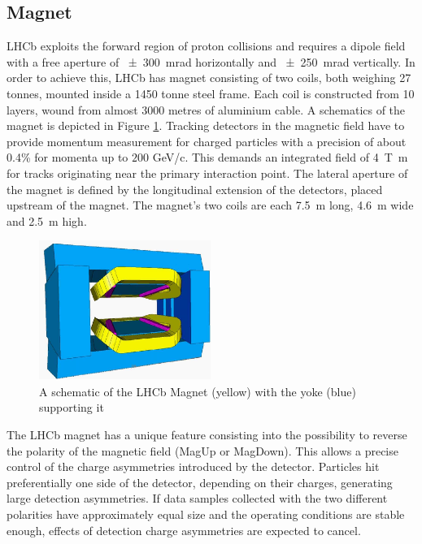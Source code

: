 \subsection{Magnet}
LHCb exploits the forward region of proton collisions and requires a dipole field with a free aperture of \SI{\pm300}{\milli\radian} horizontally and \SI{\pm250}{\milli\radian} vertically. In order to achieve this, LHCb has magnet\cite{LHCb:2000xej} consisting of two coils, both weighing 27 tonnes, mounted inside a 1450 tonne steel frame. Each coil is constructed from 10 layers, wound from almost 3000 metres of aluminium cable. A schematics of the magnet is depicted in Figure \ref{fig:magnet}.
Tracking detectors in the magnetic field have to provide momentum measurement for charged particles with a precision of about 0.4\% for momenta up to $200$ GeV/c. This demands an integrated field of \SI{4}{\tesla\meter} for tracks originating near the primary interaction point.
 The lateral aperture of the magnet is defined by the longitudinal extension of the detectors, placed upstream of the magnet. The magnet’s two coils are each \SI{7.5}{\meter} long, \SI{4.6}{\meter} wide and \SI{2.5}{\meter} high.
\begin{figure}
    \centering
    \includegraphics[width=0.5\textwidth]{figures/lhcb-magnet.png}
    \caption{A schematic of the LHCb Magnet (yellow) with the yoke (blue) supporting it}
    \label{fig:magnet}
\end{figure}
The LHCb magnet has a unique feature consisting into the possibility to reverse the polarity of the magnetic field (MagUp or MagDown). This allows a precise control of the charge asymmetries introduced by the detector. Particles hit preferentially one side of the detector, depending on their charges, generating large detection asymmetries. If data samples collected with the two different polarities have approximately equal size and the operating conditions are stable enough, effects of detection charge asymmetries are expected to cancel.

